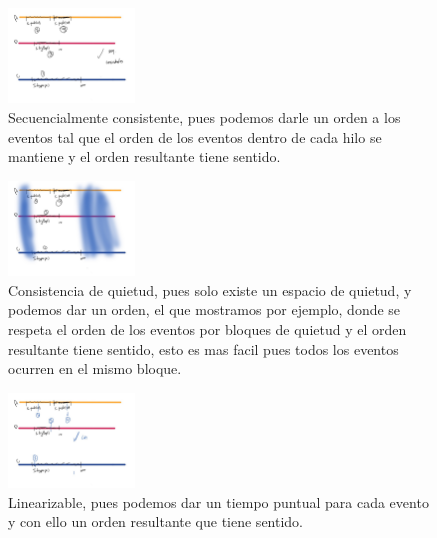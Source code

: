 \documentclass[a4paper,11pt]{article}
\begin{document}
\begin{enumerate}
{\begin{enumerate}
{        
        \begin{figure}[!h]
          \centering
          \includegraphics[width=0.3\textwidth]{Graphics/c_s}
          \caption{Secuencialmente consistente, pues podemos darle un orden a los eventos
          tal que el orden de los eventos dentro de cada hilo se mantiene y el orden
          resultante tiene sentido. }
        \end{figure}

        
        \begin{figure}[!h]
          \centering
          \includegraphics[width=0.3\textwidth]{Graphics/c_q}
          \caption{Consistencia de quietud, pues solo existe un espacio de quietud, y podemos
          dar un orden, el que mostramos por ejemplo, donde se respeta el orden de los eventos
          por bloques de quietud y el orden resultante tiene sentido, esto es mas facil pues
          todos los eventos ocurren en el mismo bloque. }
        \end{figure}

        \begin{figure}[!h]
          \centering
          \includegraphics[width=0.3\textwidth]{Graphics/c_l}
          \caption{Linearizable, pues podemos dar un tiempo puntual para cada evento y con ello
          un orden resultante que tiene sentido. }
        \end{figure}

        }
    \end{enumerate}
    }

    \clearpage


\end{enumerate}
\end{document}
